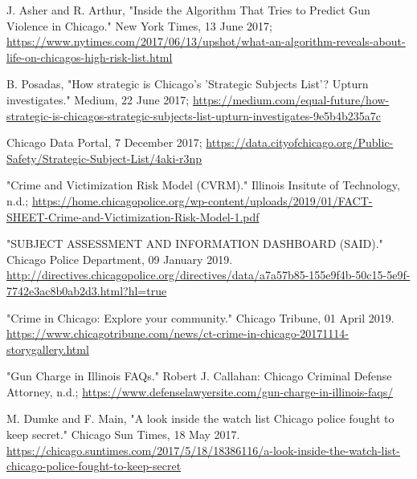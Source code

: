 \documentclass{article}
\newcommand{\link}[1]{{\color{blue}\href{#1}{#1}}}
\begin{document}
\begin{thebibliography}{9}
J. Asher and R. Arthur, "Inside the Algorithm That Tries to Predict Gun Violence in Chicago."
New York Times, 13 June 2017;
\link{https://www.nytimes.com/2017/06/13/upshot/what-an-algorithm-reveals-about-life-on-chicagos-high-risk-list.html}

B. Posadas, "How strategic is Chicago’s 'Strategic Subjects List'? Upturn investigates."
Medium, 22 June 2017;
\link{https://medium.com/equal-future/how-strategic-is-chicagos-strategic-subjects-list-upturn-investigates-9e5b4b235a7c}

Chicago Data Portal, 7 December 2017;
\link{https://data.cityofchicago.org/Public-Safety/Strategic-Subject-List/4aki-r3np}

"Crime and Victimization Risk Model (CVRM)." Illinois Insitute of Technology, n.d.;
\link{https://home.chicagopolice.org/wp-content/uploads/2019/01/FACT-SHEET-Crime-and-Victimization-Risk-Model-1.pdf}

"SUBJECT ASSESSMENT AND INFORMATION DASHBOARD (SAID)." Chicago Police Department, 09 January 2019.
\link{http://directives.chicagopolice.org/directives/data/a7a57b85-155e9f4b-50c15-5e9f-7742e3ac8b0ab2d3.html?hl=true}

"Crime in Chicago: Explore your community." Chicago Tribune, 01 April 2019.
\link{https://www.chicagotribune.com/news/ct-crime-in-chicago-20171114-storygallery.html}

"Gun Charge in Illinois FAQs." Robert J. Callahan: Chicago Criminal Defense Attorney, n.d.; \link{https://www.defenselawyersite.com/gun-charge-in-illinois-faqs/}

M. Dumke and F. Main, "A look inside the watch list Chicago police fought to keep secret." Chicago Sun Times, 18 May 2017.
\link{https://chicago.suntimes.com/2017/5/18/18386116/a-look-inside-the-watch-list-chicago-police-fought-to-keep-secret}

\end{thebibliography}
\end{document}
